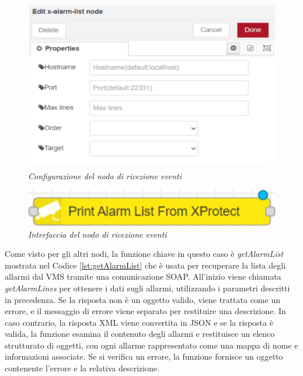 \documentclass[a4paper, openright, thesis]{report}
\begin{document}
\begin{figure}[H]
    \centering
    \includegraphics[width=0.5\linewidth]{img/8.png}
    \caption{\textit{Configurazione del nodo di ricezione eventi}}
    \label{7}
\end{figure}

\begin{figure}[H]
    \centering
    \includegraphics[width=0.5\linewidth]{img/7.png}
    \caption{\textit{Interfaccia del nodo di ricezione eventi}}
    \label{8}
\end{figure}
\noindent
Come visto per gli altri nodi, la funzione chiave in questo caso è \textit{getAlarmList} mostrata nel Codice \ref{lst:getAlarmList} che è usata per recuperare la lista degli allarmi dal VMS tramite una comunicazione SOAP. All'inizio viene chiamata \textit{getAlarmLines} per ottenere i dati sugli allarmi, utilizzando i parametri descritti in precedenza. Se la risposta non è un oggetto valido, viene trattata come un errore, e il messaggio di errore viene separato per restituire una descrizione. In caso contrario, la risposta XML viene convertita in JSON e se la risposta è valida, la funzione esamina il contenuto degli allarmi e restituisce un elenco strutturato di oggetti, con ogni allarme rappresentato come una mappa di nome e informazioni associate. Se si verifica un errore, la funzione fornisce un oggetto contenente l'errore e la relativa descrizione.

\begin{figure}[H]
    \centering
    
\end{figure} 
\end{document}

